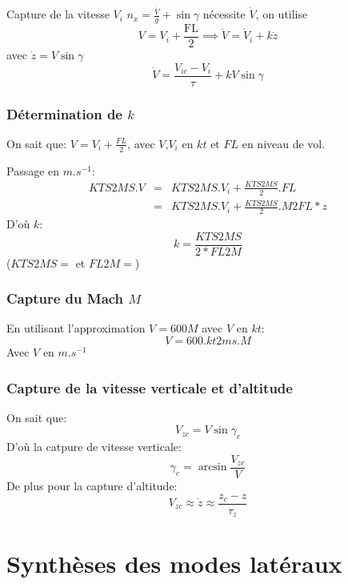 \documentclass[tikz, footheight=2em]{beamer}
\begin{document}
\begin{frame}{Capture de la vitesse \( V_i \)} \pause{}
    \(n_x = \frac{\dot{V}}{g} + \sin \gamma \) \pause{} n\'ecessite \(\dot{V}\),
    on utilise
    \[
    V = V_i + \frac{\text{FL}}{2} \implies \dot{V} = \dot{V}_i + k\dot{z}
    \]
    \pause{}
    avec \( \dot{z} = V\sin \gamma \)
    \[
    \dot{V} = \frac{V_{ic} - V_i}{\tau} + kV\sin \gamma
    \]
\end{frame}

\begin{frame}
    \frametitle{Détermination de \( k \)} \pause{}
    On sait que:
    \(
    V = V_i + \frac{FL}{2}
    \), avec \( V \),\( V_i \) en \( kt \) et \( FL \) en niveau de vol.

    Passage en \( m.s^{-1} \):
    \[
    \begin{array}{rcl}
        KTS2MS . V &=& KTS2MS . V_i + \frac{KTS2MS}{2} . FL\\
        &=& KTS2MS . V_i + \frac{KTS2MS}{2} . M2FL * z
    \end{array}
    \] \pause{}
    D'où \( k \):
    \[
    \boxed{
        k = \frac{KTS2MS}{2*FL2M}
    }
    \]
    (\( KTS2MS = \) et \( FL2M = \))

\end{frame}

\begin{frame}
    \frametitle{Capture du Mach \( M \)} \pause{}
    En utilisant l'approximation \( V = 600 M \) avec \( V \) en \( kt \):
    \[
    \boxed{
        V = 600 . kt2ms . M
    }
    \]
    Avec \( V \) en \( m.s^{-1} \)
\end{frame}

\begin{frame}
    \frametitle{Capture de la vitesse verticale et d'altitude } \pause{}
    On sait que:
    \[
    V_{zc} = V \sin \gamma_{c}
    \] \pause{}
    D'où la catpure de vitesse verticale:
    \[
    \gamma _c = \arcsin \frac{V_{zc}}{V}
    \] \pause{}
    De plus pour la capture d'altitude:
    \[
    V_{zc} \approx \dot{z}  \approx \frac{z_c - z}{\tau_z}
    \]
\end{frame}

\section{Synth\`eses des modes lat\'eraux}
\end{document}
